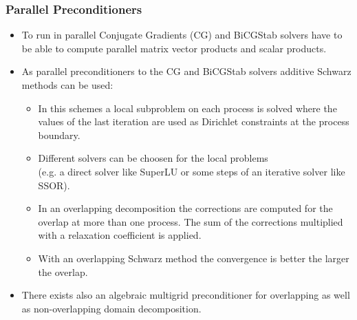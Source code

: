 \begin{frame}
\frametitle{Parallel Preconditioners}
\begin{itemize}
\item To run in parallel Conjugate Gradients (CG) and BiCGStab solvers have to be able to compute parallel matrix vector
products and scalar products.
\item As parallel preconditioners to the CG and BiCGStab solvers additive Schwarz methods can be used:
\begin{itemize}
\item In this schemes a local subproblem on each process is solved
where the values of the last iteration are used as Dirichlet constraints at the process boundary.
\item Different solvers can be choosen for the local problems\\ (e.g. a direct solver like SuperLU or some steps of an
iterative solver like SSOR).
\item In an overlapping decomposition the corrections are computed for the overlap at more than one process. The sum of the corrections multiplied with a relaxation
coefficient is applied.
\item With an overlapping Schwarz method the convergence is better the larger the overlap.
\end{itemize}
\item There exists also an algebraic multigrid preconditioner for overlapping as well as non-overlapping domain decomposition.
\end{itemize}
\end{frame}


